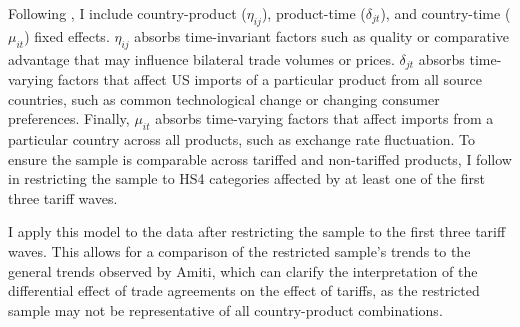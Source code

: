 Following \textcite{amiti_whos_2020}, I include country-product ($\eta_{ij}$), product-time ($\delta_{jt}$), and country-time ($\mu_{it}$) fixed effects. $\eta_{ij}$ absorbs time-invariant factors such as quality or comparative advantage that may influence bilateral trade volumes or prices. $\delta_{jt}$ absorbs time-varying factors that affect US imports of a particular product from all source countries, such as common technological change or changing consumer preferences. Finally, $\mu_{it}$ absorbs time-varying factors that affect imports from a particular country across all products, such as exchange rate fluctuation. To ensure the sample is comparable across tariffed and non-tariffed products, I follow \textcite{amiti_whos_2020} in restricting the sample to HS4 categories affected by at least one of the first three tariff waves. 

I apply this model to the data after restricting the sample to the first three tariff waves. This allows for a comparison of the restricted sample's trends to the general trends observed by Amiti, which can clarify the interpretation of the differential effect of trade agreements on the effect of tariffs, as the restricted sample may not be representative of all country-product combinations. 

